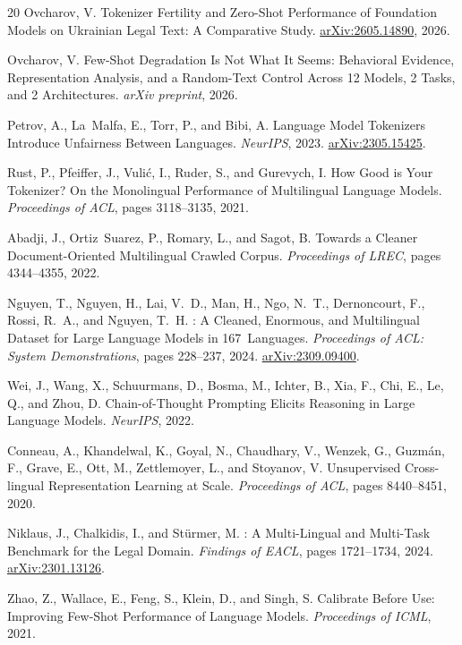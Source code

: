 \documentclass[11pt,a4paper]{article}
\begin{document}
\begin{thebibliography}{20}
Ovcharov, V.
\newblock Tokenizer Fertility and Zero-Shot Performance of Foundation Models on Ukrainian Legal Text: A Comparative Study.
\newblock \href{https://arxiv.org/abs/2605.14890}{arXiv:2605.14890}, 2026.

Ovcharov, V.
\newblock Few-Shot Degradation Is Not What It Seems: Behavioral Evidence, Representation Analysis, and a Random-Text Control Across 12 Models, 2 Tasks, and 2 Architectures.
\newblock \emph{arXiv preprint}, 2026.

Petrov, A., La~Malfa, E., Torr, P., and Bibi, A.
\newblock Language Model Tokenizers Introduce Unfairness Between Languages.
\newblock \emph{NeurIPS}, 2023.
\newblock \href{https://arxiv.org/abs/2305.15425}{arXiv:2305.15425}.

Rust, P., Pfeiffer, J., Vuli\'{c}, I., Ruder, S., and Gurevych, I.
\newblock How Good is Your Tokenizer? On the Monolingual Performance of Multilingual Language Models.
\newblock \emph{Proceedings of ACL}, pages 3118--3135, 2021.

Abadji, J., Ortiz~Suarez, P., Romary, L., and Sagot, B.
\newblock Towards a Cleaner Document-Oriented Multilingual Crawled Corpus.
\newblock \emph{Proceedings of LREC}, pages 4344--4355, 2022.

Nguyen, T., Nguyen, H., Lai, V.~D., Man, H., Ngo, N.~T., Dernoncourt, F., Rossi, R.~A., and Nguyen, T.~H.
: A Cleaned, Enormous, and Multilingual Dataset for Large Language Models in 167~Languages.
\newblock \emph{Proceedings of ACL: System Demonstrations}, pages 228--237, 2024.
\newblock \href{https://arxiv.org/abs/2309.09400}{arXiv:2309.09400}.

Wei, J., Wang, X., Schuurmans, D., Bosma, M., Ichter, B., Xia, F., Chi, E., Le, Q., and Zhou, D.
\newblock Chain-of-Thought Prompting Elicits Reasoning in Large Language Models.
\newblock \emph{NeurIPS}, 2022.

Conneau, A., Khandelwal, K., Goyal, N., Chaudhary, V., Wenzek, G., Guzm\'{a}n, F., Grave, E., Ott, M., Zettlemoyer, L., and Stoyanov, V.
\newblock Unsupervised Cross-lingual Representation Learning at Scale.
\newblock \emph{Proceedings of ACL}, pages 8440--8451, 2020.

Niklaus, J., Chalkidis, I., and St\"urmer, M.
: A Multi-Lingual and Multi-Task Benchmark for the Legal Domain.
\newblock \emph{Findings of EACL}, pages 1721--1734, 2024.
\newblock \href{https://arxiv.org/abs/2301.13126}{arXiv:2301.13126}.

Zhao, Z., Wallace, E., Feng, S., Klein, D., and Singh, S.
\newblock Calibrate Before Use: Improving Few-Shot Performance of Language Models.
\newblock \emph{Proceedings of ICML}, 2021.

\end{thebibliography}
\end{document}
